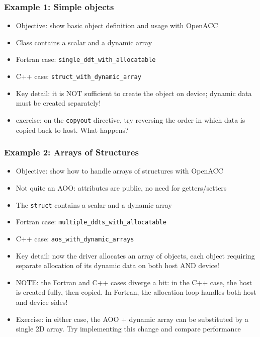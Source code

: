 \begin{frame}
    \frametitle{Example 1: Simple objects}
    \begin{itemize}
        \item Objective: show basic object definition and usage with OpenACC
        \item Class contains a scalar and a dynamic array
        \item Fortran case: \texttt{single\_ddt\_with\_allocatable}
        \item C++ case: \texttt{struct\_with\_dynamic\_array}
        \item Key detail: it is NOT sufficient to create the object on device; dynamic data must be created separately!
        \item exercise: on the \texttt{copyout} directive, try reversing the order in which data is copied back to host. What happens?
    \end{itemize}
\end{frame}

\begin{frame}
    \frametitle{Example 2: Arrays of Structures}
    \begin{itemize}
        \item Objective: show how to handle arrays of structures with OpenACC
        \item Not quite an AOO: attributes are public, no need for getters/setters
        \item The \texttt{struct} contains a scalar and a dynamic array
        \item Fortran case: \texttt{multiple\_ddts\_with\_allocatable}
        \item C++ case: \texttt{aos\_with\_dynamic\_arrays}
        \item Key detail: now the driver allocates an array of objects, each object requiring separate allocation of its dynamic data on both host AND device!
        \item NOTE: the Fortran and C++ cases diverge a bit: in the C++ case, the host is created fully, then copied. In Fortran, the allocation loop handles both host and device sides!
        \item Exercise: in either case, the AOO + dynamic array can be substituted by a single 2D array. Try implementing this change and compare performance
    \end{itemize}
\end{frame}

